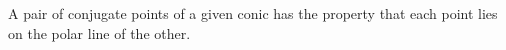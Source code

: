 A pair of conjugate points of a given conic has the property that
each point lies on the polar line of the other.